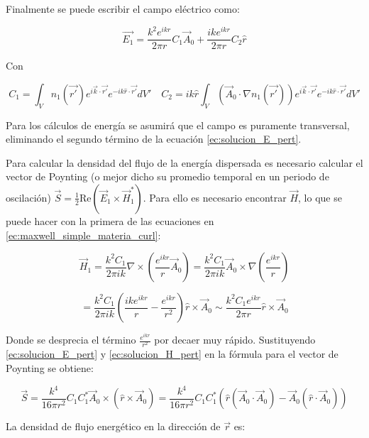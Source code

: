 Finalmente se puede escribir el campo eléctrico como:

\begin{equation}\label{ec:solucion_E_pert}
    \vec{E_1} = \frac{k^2 e^{ikr}}{2\pi r} C_1 \vec{A}_0  + \frac{ike^{ikr}}{2\pi r}C_2\hat{r}
\end{equation}

Con

\begin{equation}
    C_1 =\int_V n_1(\vec{r'}) e^{i\vec{k}\cdot\vec{r'}} e^{-ik\hat{r} \cdot \vec{r'}} dV' \quad C_2=ik \hat{r} \int_V (\vec{A}_0 \cdot \nabla n_1(\vec{r'})) e^{i\vec{k}\cdot\vec{r'}}e^{-ik\hat{r} \cdot \vec{r'}} dV'
\end{equation}

Para los cálculos de energía se asumirá que el campo es puramente transversal, eliminando el segundo término de la ecuación \ref{ec:solucion_E_pert}.

Para calcular la densidad del flujo de la energía dispersada es necesario calcular el vector de Poynting (o mejor dicho su promedio temporal en un periodo de oscilación) $\vec{S} = \frac{1}{2} \text{Re} \left(\vec{E}_1 \times \vec{H}_1^*\right)$. Para ello es necesario encontrar $\vec{H}$, lo que se puede hacer con la primera de las ecuaciones en \ref{ec:maxwell_simple_materia_curl}:

\begin{equation}\label{ec:solucion_H_pert}
    \vec{H}_1 = \frac{k^2 C_1}{2\pi i k} \nabla\times \left(\frac{e^{ikr}}{r} \vec{A}_0\right) = \frac{k^2 C_1}{2\pi i k} \vec{A}_0 \times  \nabla \left(\frac{e^{ikr}}{r}\right)
\end{equation}

$$= \frac{k^2 C_1}{2\pi i k} \left(\frac{ike^{ikr}}{r} - \frac{e^{ikr}}{r^2}\right) \hat{r} \times \vec{A}_0 \sim \frac{k^2 C_1 e^{ikr}}{2\pi r} \hat{r} \times \vec{A}_0$$

Donde se desprecia el término $\frac{e^{ikr}}{r^2}$ por decaer muy rápido. Sustituyendo \ref{ec:solucion_E_pert} y \ref{ec:solucion_H_pert} en la fórmula para el vector de Poynting se obtiene: 

\begin{equation}
    \vec{S} = \frac{k^4}{16\pi r^2} C_1 C_1^* \vec{A}_0 \times (\hat{r} \times \vec{A}_0) = \frac{k^4}{16\pi r^2} C_1 C_1^* (\hat{r}(\vec{A}_0 \cdot \vec{A}_0) - \vec{A}_0(\hat{r} \cdot \vec{A}_0))
\end{equation}

La densidad de flujo energético en la dirección de $\vec{r}$ es:

